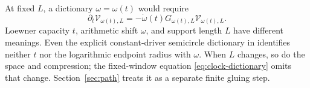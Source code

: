 At fixed $L$, a dictionary $\omega=\omega(t)$ would require
\begin{equation}\label{eq:clock-dictionary}
 \partial_t\mathcal V_{\omega(t),L}
 =-\dot\omega(t)G_{\omega(t),L}\mathcal V_{\omega(t),L}.
\end{equation}
Loewner capacity $t$, arithmetic shift $\omega$, and support length
$L$ have different meanings. Even the explicit constant-driver
semicircle dictionary in \cite[Section~S3]{Supplement} identifies
neither $t$ nor the logarithmic endpoint radius with $\omega$.
When $L$ changes, so do the space and compression; the fixed-window
equation \eqref{eq:clock-dictionary} omits that change.
Section~\ref{sec:path} treats it as a separate finite gluing step.
